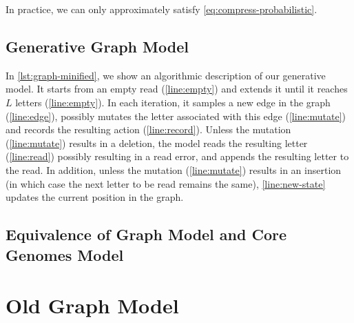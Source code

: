 In practice, we can only approximately satisfy \cref{eq:compress-probabilistic}.


\subsection{Generative Graph Model}
\begin{figure}
	
\end{figure}

In \cref{lst:graph-minified}, we show an algorithmic description of our
generative model. It starts from an empty read (\cref{line:empty}) and extends
it until it reaches $L$ letters (\cref{line:empty}). In each iteration, it
samples a new edge in the graph (\cref{line:edge}), possibly mutates the letter
associated with this edge (\cref{line:mutate}) and records the resulting action
(\cref{line:record}). Unless the mutation (\cref{line:mutate}) results in a
deletion, the model reads the resulting letter (\cref{line:read}) possibly
resulting in a read error, and appends the resulting letter to the read. In
addition, unless the mutation (\cref{line:mutate}) results in an insertion (in
which case the next letter to be read remains the same), \cref{line:new-state}
updates the current position in the graph.

\subsection{Equivalence of Graph Model and Core Genomes Model}


\section{Old Graph Model}

